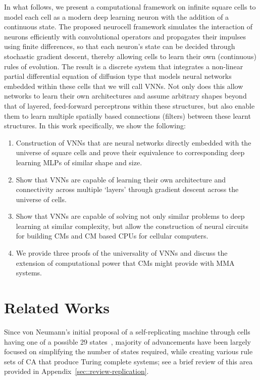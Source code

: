 \documentclass[11pt]{article}
\begin{document}
In what follows, we present a computational framework on infinite square cells to model each cell as a modern deep learning neuron with the addition of a continuous state. The proposed neurocell framework simulates the interaction of neurons efficiently with convolutional operators and propagates their impulses using finite differences, so that each neuron's state can be decided through stochastic gradient descent, thereby allowing cells to learn their own (continuous) rules of evolution.  The result is a discrete system that integrates a non-linear partial differential equation of diffusion type that models neural networks embedded within these cells that we will call \acp{VNN}. Not only does this allow networks to learn their own architectures and assume arbitrary shapes beyond that of layered, feed-forward perceptrons within these structures, but also enable them to learn multiple spatially based connections (filters) between these learnt structures. In this work specifically, we show the following:
\begin{enumerate}
	\item Construction of \acp{VNN} that are neural networks directly embedded with the universe of square cells and prove their equivalence to corresponding deep learning \acp{MLP} of similar shape and size.
	\item Show that \acp{VNN} are capable of learning their own architecture and connectivity across multiple `layers' through gradient descent across the universe of cells.
	\item Show that \acp{VNN} are capable of solving not only similar problems to deep learning at similar complexity, but allow the construction of neural circuits for building \acp{CM} and \ac{CM} based \acp{CPU} for cellular computers. 
	\item We provide three proofs of the universality of \acp{VNN} and discuss the extension of computational power that \acp{CM} might provide with \ac{MMA} systems.
\end{enumerate}

\section{Related Works}
Since von Neumann's initial proposal of a self-replicating machine through cells having one of a possible 29 states~\citep[pg. 132]{von_neumann_theory_1966}, majority of advancements have been largely focused on simplifying the number of states required, while creating various rule sets of \ac{CA} that produce Turing complete systems; see a brief review of this area provided in Appendix~\ref{sec::review-replication}.
\end{document}
